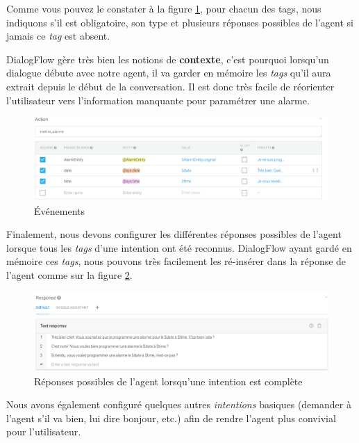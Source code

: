 Comme vous pouvez le constater à la figure \ref{action}, pour chacun des tags, nous indiquons s'il est obligatoire, son type et plusieurs réponses possibles de l'agent si jamais ce \emph{tag} est absent. 

DialogFlow gère 
très bien les notions de \textbf{contexte}, c'est pourquoi lorsqu'un dialogue débute avec notre agent, il va garder en mémoire les \emph{tags} qu'il aura extrait depuis le 
début de la conversation. Il est donc très facile de réorienter l'utilisateur vers l'information manquante pour paramétrer une alarme. 

\begin{figure}[H]
    \centering
        \centering
        \includegraphics[width=\textwidth]{images/action.png}
        \caption{Événements}
        \label{action}
\end{figure}

Finalement, nous devons configurer les différentes réponses possibles de l'agent lorsque tous les \emph{tags} d'une intention ont été reconnus. DialogFlow ayant gardé en mémoire 
ces \emph{tags}, nous pouvons très facilement les ré-insérer dans la réponse de l'agent comme sur la figure \ref{answer}.

\begin{figure}[H]
    \centering
        \centering
        \includegraphics[width=1\textwidth]{images/answer.png}
        \caption{Réponses possibles de l'agent lorsqu'une intention est complète}
        \label{answer}
\end{figure}

Nous avons également configuré quelques autres \emph{intentions} basiques (demander à l'agent s'il va bien, lui dire bonjour, etc.) afin de rendre l'agent plus convivial 
pour l'utilisateur. 

